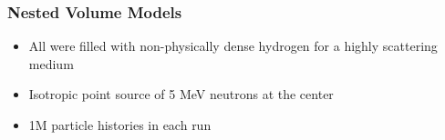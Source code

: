 \documentclass[12pt]{beamer}
\begin{document}
\begin{frame}
\frametitle{Nested Volume Models}
\begin{itemize}
\item All were filled with non-physically dense hydrogen for a highly scattering medium 
\item Isotropic point source of 5 MeV neutrons at the center
\item 1M particle histories in each run
\end{itemize}

\begin{center}
\end{center}
\end{frame}
\end{document}
